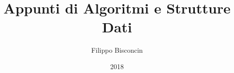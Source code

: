 \documentclass[11pt,a4paper,twoside,openright]{book}
\title{Appunti di Algoritmi e Strutture Dati}
\author{Filippo Bisconcin}
\date{2018}
\begin{document}
\frontmatter

\begin{titlepage}
\maketitle
\end{titlepage}

\pagestyle{plain}
\tableofcontents
\pagestyle{empty}\cleardoublepage
{}

\pagestyle{fancy} 
\fancyfoot{}                                               
\renewcommand{\chaptermark}[1]{\markboth{\chaptername\ \thechapter.\ #1}{}} 
\renewcommand{\sectionmark}[1]{\markright{\thesection.\ #1}}         
\fancyhead[LE,RO]{\bfseries\thepage}    
                                        
\fancyhead[RE]{\bfseries\leftmark}    
\fancyhead[LO]{\bfseries\rightmark}     
\renewcommand{\headrulewidth}{0.3pt} 

\mainmatter






























\backmatter
\end{document}

